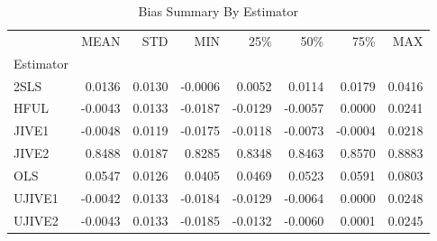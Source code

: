\begin{table}[ht]
\centering
\caption{Bias Summary By Estimator}
\begin{tabular}{lrrrrrrr}
\toprule
 & MEAN & STD & MIN & 25\% & 50\% & 75\% & MAX \\
Estimator &  &  &  &  &  &  &  \\
\midrule
2SLS & 0.0136 & 0.0130 & -0.0006 & 0.0052 & 0.0114 & 0.0179 & 0.0416 \\
HFUL & -0.0043 & 0.0133 & -0.0187 & -0.0129 & -0.0057 & 0.0000 & 0.0241 \\
JIVE1 & -0.0048 & 0.0119 & -0.0175 & -0.0118 & -0.0073 & -0.0004 & 0.0218 \\
JIVE2 & 0.8488 & 0.0187 & 0.8285 & 0.8348 & 0.8463 & 0.8570 & 0.8883 \\
OLS & 0.0547 & 0.0126 & 0.0405 & 0.0469 & 0.0523 & 0.0591 & 0.0803 \\
UJIVE1 & -0.0042 & 0.0133 & -0.0184 & -0.0129 & -0.0064 & 0.0000 & 0.0248 \\
UJIVE2 & -0.0043 & 0.0133 & -0.0185 & -0.0132 & -0.0060 & 0.0001 & 0.0245 \\
\bottomrule
\end{tabular}
\end{table}
